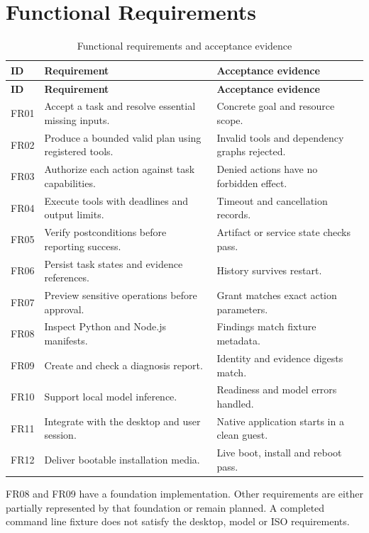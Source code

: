 \section{Functional Requirements}
\begin{longtable}{P{16mm}P{79mm}P{43mm}}
\caption{Functional requirements and acceptance evidence}\label{tab:functional}\\
\toprule\textbf{ID} & \textbf{Requirement} & \textbf{Acceptance evidence}\\\midrule\endfirsthead
\toprule\textbf{ID} & \textbf{Requirement} & \textbf{Acceptance evidence}\\\midrule\endhead
FR01 & Accept a task and resolve essential missing inputs. & Concrete goal and resource scope.\\
FR02 & Produce a bounded valid plan using registered tools. & Invalid tools and dependency graphs rejected.\\
FR03 & Authorize each action against task capabilities. & Denied actions have no forbidden effect.\\
FR04 & Execute tools with deadlines and output limits. & Timeout and cancellation records.\\
FR05 & Verify postconditions before reporting success. & Artifact or service state checks pass.\\
FR06 & Persist task states and evidence references. & History survives restart.\\
FR07 & Preview sensitive operations before approval. & Grant matches exact action parameters.\\
FR08 & Inspect Python and Node.js manifests. & Findings match fixture metadata.\\
FR09 & Create and check a diagnosis report. & Identity and evidence digests match.\\
FR10 & Support local model inference. & Readiness and model errors handled.\\
FR11 & Integrate with the desktop and user session. & Native application starts in a clean guest.\\
FR12 & Deliver bootable installation media. & Live boot, install and reboot pass.\\\bottomrule
\end{longtable}

FR08 and FR09 have a foundation implementation. Other requirements are either partially represented by that foundation or remain planned. A completed command line fixture does not satisfy the desktop, model or ISO requirements.

